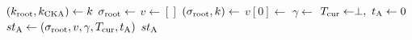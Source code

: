 \algrenewcommand\textproc{}
\algrenewcommand{}

\begin{minipage}{1\linewidth}
  {\fontsize{8}{10}\selectfont

  \begin{algorithmic}[1]
    \State $(k_\text{root},k_\text{CKA}) \gets k$
    \State $\sigma_\text{root} \gets$ 
    \State $v \gets []$
    \State $(\sigma_\text{root},k) \gets$ 
    \State $v[0] \gets$ 
    \State $\gamma \gets$ 
    \State $T_\text{cur} \gets \perp, \ t_\text{A} \gets 0$
    \State $st_\text{A} \gets (\sigma_\text{root},v,\gamma,T_\text{cur},t_\text{A})$
    \State \Return $st_\text{A}$
    \EndProcedure
  \end{algorithmic}
  }
\end{minipage}
